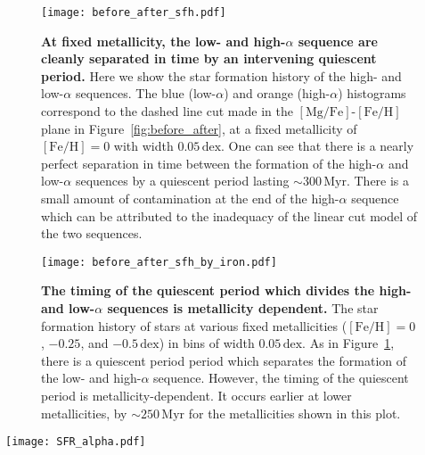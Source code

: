 \documentclass[twocolumn,linenumbers,trackchanges]{aastex631}
\newcommand{\Gyr}{\ensuremath{\textrm{Gyr}}}
\newcommand{\Myr}{\ensuremath{\textrm{Myr}}}
\newcommand{\kpc}{\ensuremath{\textrm{kpc}}}
\newcommand{\FeH}{\ensuremath{[\textrm{Fe}/\textrm{H}]}}
\newcommand{\MgFe}{\ensuremath{[\textrm{Mg}/\textrm{Fe}]}}
\newcommand{\dex}{\ensuremath{\textrm{dex}}}
\begin{document}
\begin{figure}
  \centering
  \texttt{[image: before\_after\_sfh.pdf]}
  \caption{\textbf{At fixed metallicity, the low- and high-$\alpha$ sequence are cleanly separated in time by an intervening quiescent period.} Here we show the star formation history of the high- and low-$\alpha$ sequences. The blue (low-$\alpha$) and orange (high-$\alpha$) histograms correspond to the dashed line cut made in the \MgFe{}-\FeH{} plane in Figure~\ref{fig:before_after}, at a fixed metallicity of $\FeH=0$ with width $0.05\,\dex$. One can see that there is a nearly perfect separation in time between the formation of the high-$\alpha$ and low-$\alpha$ sequences by a quiescent period lasting $\sim300\,\Myr$. There is a small amount of contamination at the end of the high-$\alpha$ sequence which can be attributed to the inadequacy of the linear cut model of the two sequences.}
  \label{fig:before_after_sfh}
\end{figure}

\begin{figure}
  \centering
  \texttt{[image: before\_after\_sfh\_by\_iron.pdf]}
  \caption{\textbf{The timing of the quiescent period which divides the high- and low-$\alpha$ sequences is metallicity dependent.} The star formation history of stars at various fixed metallicities ($\FeH=0$, $-0.25$, and $-0.5\,\textrm{dex}$) in bins of width $0.05\,\dex$. As in Figure~\ref{fig:before_after_sfh}, there is a quiescent period period which separates the formation of the low- and high-$\alpha$ sequence. However, the timing of the quiescent period is metallicity-dependent. It occurs earlier at lower metallicities, by $\sim250\,\Myr$ for the metallicities shown in this plot.}
  \label{fig:before_after_sfh_by_iron}
\end{figure}

\begin{figure*}
  \centering
  \texttt{[image: SFR\_alpha.pdf]}
  \caption{\textbf{A global suppression of star formation is associcated with a decrease in \MgFe{}, which is seen in the bimodal simulation but not in the unimodal simulation.} Here, we show both the SFR of the central galaxy ($r<15\,\kpc$) and the median \MgFe{} for gas at $2\,\kpc<r<5\,\kpc$ at a fixed \FeH{} bin centered on $0$ with width $0.05\,\dex$. The left panel shows the bimodal simulation while the right panel shows the unimodal simulation. A vertical dashed line at $2\,\Gyr$ in each plot indicates the approximate time of the merger, but before complete coalescence. In the left panel, a shaded region from $2.5\,\Gyr$ to $2.75\,\Gyr$ indicates the approximate period of quiescence shown in Figure~\ref{fig:before_after_sfh}. This suppression of star formation is associated with a sudden drop in the median \MgFe{} of the gas. Neither the suppression of star formation nor the drop in \MgFe{} are seen in the unimodal simulation.}
  \label{fig:SFR_alpha}
\end{figure*}
\end{document}
